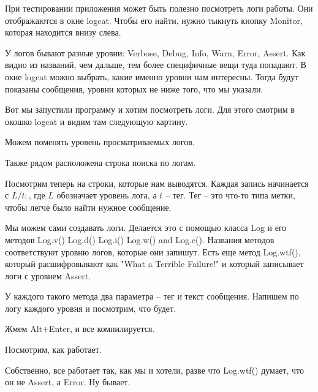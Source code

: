 

При тестировании приложения может быть полезно посмотреть логи работы. Они отображаются в окне logcat. Чтобы его найти, нужно тыкнуть кнопку Monitor, которая находится внизу слева.


У логов бывают разные уровни: Verbose, Debug, Info, Warn, Error, Assert. Как видно из названий, чем дальше, тем более специфичные вещи туда попадают. В окне logcat можно выбрать, какие именно уровни нам интересны. Тогда будут показаны сообщения, уровни которых не ниже того, что мы указали. 


Вот мы запустили программу и хотим посмотреть логи. Для этого смотрим в окошко logcat и видим там следующую картину. 


Можем поменять уровень просматриваемых логов.


Также рядом расположена строка поиска по логам.

Посмотрим теперь на строки, которые нам выводятся. 
Каждая запись начинается с $L/t:$, где $L$ обозначает уровень лога, а $t$ -- тег. Тег -- это что-то типа метки, чтобы легче было найти нужное сообщение.


Мы можем сами создавать логи. Делается это с помощью класса Log и его методов Log.v() Log.d() Log.i() Log.w() and Log.e(). Названия методов соответствуют уровню логов, которые они запишут. Есть еще метод Log.wtf(), который расшифровывают как "What a Terrible Failure!" и который записывает логи с уровнем Assert. 

У каждого такого метода два параметра -- тег и текст сообщения. Напишем по логу каждого уровня и посмотрим, что будет.


Жмем Alt+Enter, и все компилируется.

Посмотрим, как работает.


Собственно, все работает так, как мы и хотели, разве что Log.wtf() думает, что он не Assert, а Error. Ну бывает. 




